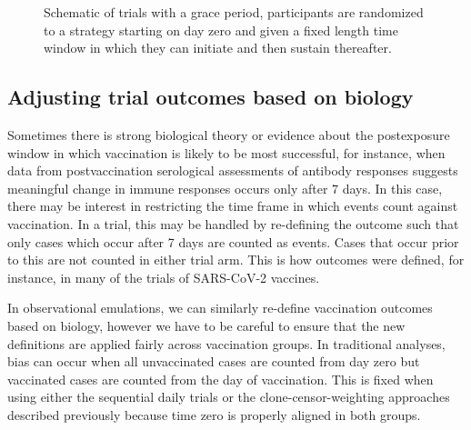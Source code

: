 \begin{appendix}
\begin{figure}[p]
            \caption{Schematic of trials with a grace period, participants are randomized to a strategy starting on day zero and given a fixed length time window in which they can initiate and then sustain thereafter.}
            \label{fig:design3}
    \end{figure}

    \clearpage

    \subsection{Adjusting trial outcomes based on biology}
    Sometimes there is strong biological theory or evidence about the postexposure window in which vaccination is likely to be most successful, for instance, when data from postvaccination serological assessments of antibody responses suggests meaningful change in immune responses occurs only after 7 days. In this case, there may be interest in restricting the time frame in which events count against vaccination. In a trial, this may be handled by re-defining the outcome such that only cases which occur after 7 days are counted as events. Cases that occur prior to this are not counted in either trial arm. This is how outcomes were defined, for instance, in many of the trials of SARS-CoV-2 vaccines. 
        
    In observational emulations, we can similarly re-define vaccination outcomes based on biology, however we have to be careful to ensure that the new definitions are applied fairly across vaccination groups. In traditional analyses, bias can occur when all unvaccinated cases are counted from day zero but vaccinated cases are counted from the day of vaccination. This is fixed when using either the sequential daily trials or the clone-censor-weighting approaches described previously because time zero is properly aligned in both groups.


\end{appendix}
